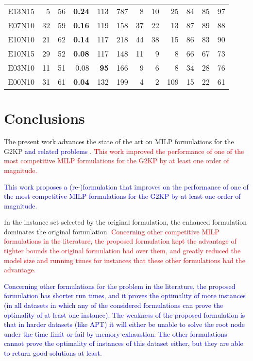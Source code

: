 \documentclass[ppgc,tese,english,formais,babel]{iiufrgs}
\newif\iffinalversion
\newcommand{\newtext}[1]{\iffinalversion%
#1%
\else%
\textcolor{blue}{#1}%
\fi%
}
\newcommand{\oldtext}[1]{\iffinalversion%
\else%
\textcolor{red}{#1}%
\fi%
}
\newcommand{\bestcolumnemph}[1]{\textbf{#1}}
\begin{document}
\begin{table}[!ht]
\begin{center}
\begin{tabular}{lrrrrrrrrrrr}
E13N15 & 5 & 56 & \bestcolumnemph{0.24} & 113 & 787 & 8 & 10 & 25 & 84 & 85 & 97 \\
E07N10 & 32 & 59 & \bestcolumnemph{0.16} & 119 & 158 & 37 & 22 & 13 & 87 & 89 & 88 \\
E10N10 & 21 & 62 & \bestcolumnemph{0.14} & 117 & 218 & 44 & 38 & 15 & 86 & 83 & 90 \\
E10N15 & 29 & 52 & \bestcolumnemph{0.08} & 117 & 148 & 11 & 9 & 8 & 66 & 67 & 73 \\
E03N10 & 11 & 51 & 0.08 & \bestcolumnemph{95} & 166 & 9 & 6 & 8 & 34 & 28 & 76 \\
E00N10 & 31 & 61 & \bestcolumnemph{0.04} & 132 & 199 & 4 & 2 & 109 & 15 & 22 & 61 \\\hline\hline
\end{tabular}
\end{center}
\end{table}

\chapter{Conclusions}
\label{sec:conclusions}



The present work advances the state of the art on MILP formulations for the G2KP \newtext{and related problems}.
\oldtext{This work improved the performance of one of the most competitive MILP formulations for the G2KP by at least one order of magnitude.}
\newtext{This work proposes a (re-)formulation that improves on the performance of one of the most competitive MILP formulations for the G2KP by at least one order of magnitude.}
In the instance set selected by the original formulation, the enhanced formulation dominates the original formulation.
\oldtext{Concerning other competitive MILP formulations in the literature, the proposed formulation kept the advantage of tighter bounds the original formulation had over them, and greatly reduced the model size and running times for instances that these other formulations had the advantage.}
\newtext{
Concerning other formulations for the problem in the literature, the proposed formulation has shorter run times, and it proves the optimality of more instances (in all datasets in which any of the considered formulations can prove the optimality of at least one instance).
The weakness of the proposed formulation is that in harder datasets (like APT) it will either be unable to solve the root node under the time limit or fail by memory exhaustion.
The other formulations cannot prove the optimality of instances of this dataset either, but they are able to return good solutions at least.
}
\end{document}
